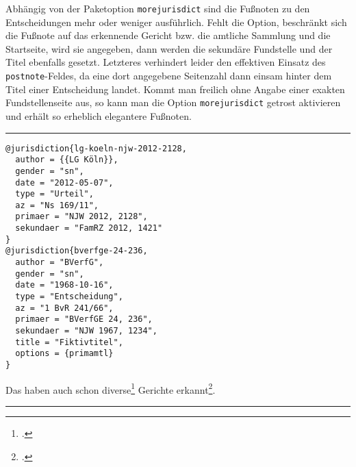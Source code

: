\documentclass[11pt,a4paper,DIV=calc]{scrartcl}
\newenvironment{rubexample}{\par\vspace{\baselineskip}\hrule\par\begin{refsection}}{\end{refsection}\par\hrule\par\vspace{\baselineskip}}
\begin{document}
Abhängig von der Paketoption \verb+morejurisdict+ sind die Fußnoten zu
den Entscheidungen mehr oder weniger ausführlich. Fehlt die Option,
beschränkt sich die Fußnote auf das erkennende Gericht bzw. die
amtliche Sammlung und die Startseite, wird sie angegeben, dann werden
die sekundäre Fundstelle und der Titel ebenfalls gesetzt. Letzteres
verhindert leider den effektiven Einsatz des \verb+postnote+-Feldes,
da eine dort angegebene Seitenzahl dann einsam hinter dem Titel einer
Entscheidung landet. Kommt man freilich ohne Angabe einer exakten
Fundstellenseite aus, so kann man die Option \verb+morejurisdict+
getrost aktivieren und erhält so erheblich elegantere Fußnoten.

\begin{rubexample}
\begin{verbatim}
@jurisdiction{lg-koeln-njw-2012-2128,
  author = {{LG Köln}},
  gender = "sn",
  date = "2012-05-07",
  type = "Urteil",
  az = "Ns 169/11",
  primaer = "NJW 2012, 2128",
  sekundaer = "FamRZ 2012, 1421"
}
@jurisdiction{bverfge-24-236,
  author = "BVerfG",
  gender = "sn",
  date = "1968-10-16",
  type = "Entscheidung",
  az = "1 BvR 241/66",
  primaer = "BVerfGE 24, 236",
  sekundaer = "NJW 1967, 1234",
  title = "Fiktivtitel",
  options = {primamtl}
}
\end{verbatim}

Das haben auch schon diverse\footcite[2129]{lg-koeln-njw-2012-2128}
Gerichte erkannt\footcite{bverfge-24-236}.

\printbibliography
\end{rubexample}
\end{document}
